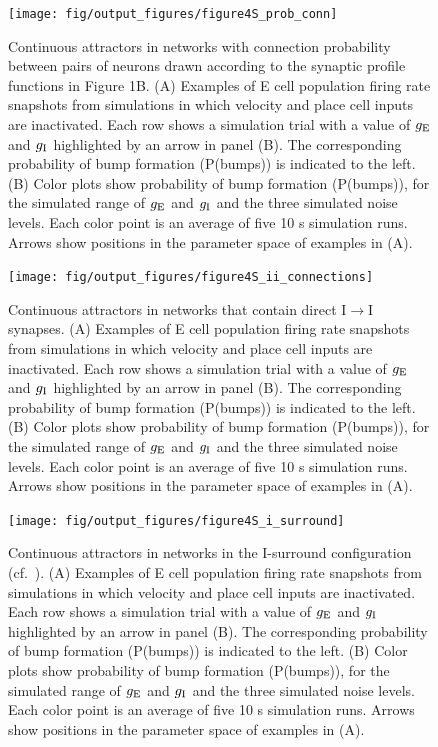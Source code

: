 \documentclass[a4paper,12pt]{article}
\newcommand{\ssc}[3]{\ensuremath{#1_{\text{#2}_{\text{#3}}}}}
\newcommand{\gE      }{\ssc{g}      {\scriptsize{E}}{}}
\newcommand{\gI      }{\ssc{g}      {\scriptsize{I}}{}}
\begin{document}
\clearpage

\setcounter{figure}{0}
\renewcommand{\figurename}{Figure 4 - figure supplement}

\begin{figure}[p]
    \internallinenumbers
    \centering
        \texttt{[image: fig/output\_figures/figure4S\_prob\_conn]}
    \caption{Continuous attractors in networks with connection probability
    between pairs of neurons drawn according to the synaptic profile functions
    in Figure 1B. (A) Examples of E cell population firing rate snapshots from
    simulations in which velocity and place cell inputs are inactivated. Each
    row shows a simulation trial with a value of $\gE$ and $\gI$ highlighted by an
    arrow in panel (B). The corresponding probability of bump formation
    (P(bumps)) is indicated to the left.  (B) Color plots show probability of
    bump formation (P(bumps)), for the simulated range of $\gE$ and $\gI$ and the
    three simulated noise levels. Each color point is an average of five 10 s
    simulation runs. Arrows show positions in the parameter space of examples
    in (A).}
\end{figure}

\clearpage

\begin{figure}[p]
    \internallinenumbers
    \centering
        \texttt{[image: fig/output\_figures/figure4S\_ii\_connections]}
    \caption{Continuous attractors in networks that contain direct
    I$\rightarrow$I synapses. (A) Examples of E cell population firing rate
    snapshots from simulations in which velocity and place cell inputs are
    inactivated. Each row shows a simulation trial with a value of $\gE$ and
    $\gI$
    highlighted by an arrow in panel (B). The corresponding probability of bump
    formation (P(bumps)) is indicated to the left.  (B) Color plots show
    probability of bump formation (P(bumps)), for the simulated range of $\gE$ and
    $\gI$ and the three simulated noise levels. Each color point is an average of
    five 10 s simulation runs. Arrows show positions in the parameter space of
    examples in (A).}
\end{figure}

\clearpage

\begin{figure}[p]
    \internallinenumbers
    \centering
        \texttt{[image: fig/output\_figures/figure4S\_i\_surround]}
    \caption{Continuous attractors in networks in the I-surround configuration
    (cf.\ \cite{Pastoll:2013ff}). (A) Examples of E cell population firing rate
    snapshots from simulations in which velocity and place cell inputs are
    inactivated. Each row shows a simulation trial with a value of $\gE$ and
    $\gI$
    highlighted by an arrow in panel (B). The corresponding probability of bump
    formation (P(bumps)) is indicated to the left.  (B) Color plots show
    probability of bump formation (P(bumps)), for the simulated range of $\gE$ and
    $\gI$ and the three simulated noise levels. Each color point is an average of
    five 10 s simulation runs. Arrows show positions in the parameter space of
    examples in (A).}
\end{figure}
\end{document}
